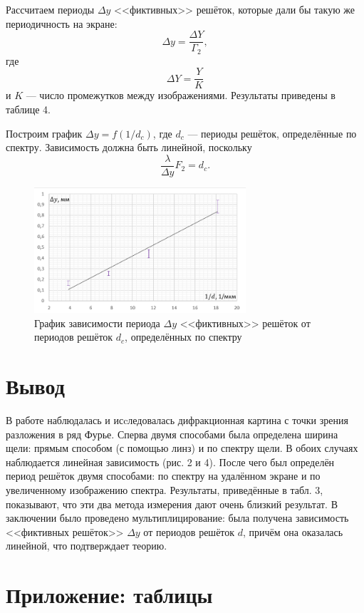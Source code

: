 \documentclass[a4paper]{article}
\begin{document}
\noindent Рассчитаем периоды $\Delta y$ <<фиктивных>> решёток, которые дали бы такую же периодичность на экране: $$\Delta y = \frac{\Delta Y}{\Gamma_2},$$ где $$\Delta Y = \frac{Y}{K}$$ и $K$ --- число промежутков между изображениями. Результаты приведены в таблице 4. \medskip

\noindent Построим график $\Delta y = f(1/d_c)$, где $d_c$ --- периоды решёток, определённые по спектру. Зависимость должна быть линейной, поскольку 
$$\frac{\lambda}{\Delta y}F_2 = d_c.$$ \newpage

\begin{figure}[h!]
    \centering
    \includegraphics[width = 0.7\textwidth]{image/graph3.png}
    \caption{График зависимости периода $\Delta y$ <<фиктивных>> решёток от периодов решёток $d_c$, определённых по спектру}
\end{figure}

\section{Вывод}

В работе наблюдалась и исcледовалась дифракционная картина с точки зрения разложения в ряд Фурье. Сперва двумя способами была определена ширина щели: прямым способом (с помощью линз) и по спектру щели. В обоих случаях наблюдается линейная зависимость (рис. 2 и 4). После чего был определён период решёток двумя способами: по спектру на удалённом экране и по увеличенному изображению спектра. Результаты, приведённые в табл. 3, показывают, что эти два метода измерения дают очень близкий результат. В заключении было проведено мультиплицирование: была получена зависимость <<фиктивных решёток>> $\Delta y$ от периодов решёток $d$, причём она оказалась линейной, что подтверждает теорию.

\section{Приложение: таблицы}
\end{document}
